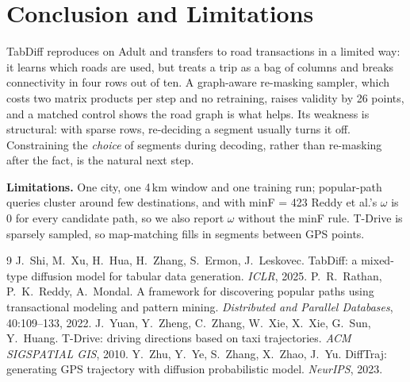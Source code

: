 \documentclass[10pt,twocolumn,a4paper]{article}
\begin{document}
\section{Conclusion and Limitations}
TabDiff reproduces on Adult and transfers to road transactions in a limited way: it learns which roads are
used, but treats a trip as a bag of columns and breaks connectivity in four rows out of ten. A graph-aware
re-masking sampler, which costs two matrix products per step and no retraining, raises validity by 26
points, and a matched control shows the road graph is what helps. Its weakness is structural: with sparse
rows, re-deciding a segment usually turns it off. Constraining the \emph{choice} of segments during
decoding, rather than re-masking after the fact, is the natural next step.

\textbf{Limitations.} One city, one 4\,km window and one training run; popular-path queries cluster around
few destinations, and with minF = 423 Reddy et al.'s $\omega$ is 0 for every candidate path, so we also
report $\omega$ without the minF rule. T-Drive is sparsely sampled, so map-matching fills in segments between
GPS points.

\begin{thebibliography}{9}\small
{} J.~Shi, M.~Xu, H.~Hua, H.~Zhang, S.~Ermon, J.~Leskovec. TabDiff: a mixed-type diffusion model
for tabular data generation. \emph{ICLR}, 2025.
 P.~R.~Rathan, P.~K.~Reddy, A.~Mondal. A framework for discovering popular paths using
transactional modeling and pattern mining. \emph{Distributed and Parallel Databases}, 40:109--133, 2022.
 J.~Yuan, Y.~Zheng, C.~Zhang, W.~Xie, X.~Xie, G.~Sun, Y.~Huang. T-Drive: driving directions
based on taxi trajectories. \emph{ACM SIGSPATIAL GIS}, 2010.
 Y.~Zhu, Y.~Ye, S.~Zhang, X.~Zhao, J.~Yu. DiffTraj: generating GPS trajectory with diffusion
probabilistic model. \emph{NeurIPS}, 2023.
\end{thebibliography}
\end{document}
